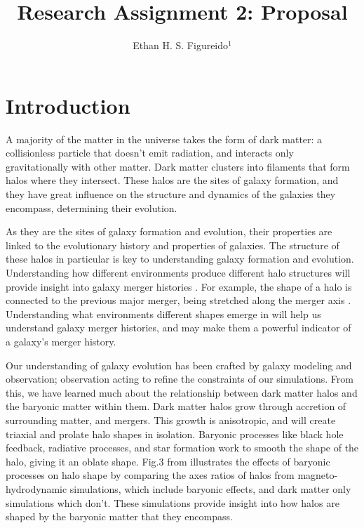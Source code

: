 \documentclass[fleqn,usenatbib]{mnras}
\title[Research Assignment 2]{Research Assignment 2: Proposal}
\author[E. H. S. Figureido]{Ethan H. S. Figureido$^{1}$}
\begin{document}
\label{firstpage}
\pagerange{\pageref{firstpage}--\pageref{lastpage}}
\maketitle



\section{Introduction}

A majority of the matter in the universe takes the form of dark matter: a collisionless particle that doesn't emit radiation, and interacts only gravitationally with other matter. Dark matter clusters into filaments that form halos where they intersect. These halos are the sites of galaxy formation, and they have great influence on the structure and dynamics of the galaxies they encompass, determining their evolution. 

As they are the sites of galaxy formation and evolution, their properties are linked to the evolutionary history and properties of galaxies. The structure of these halos in particular is key to understanding galaxy formation and evolution. Understanding how different environments produce different halo structures will provide insight into galaxy merger histories \citep{Drakos_2019}. For example, the shape of a halo is connected to the previous major merger, being stretched along the merger axis \citep{Despali_2016}. Understanding what environments different shapes emerge in will help us understand galaxy merger histories, and may make them a powerful indicator of a galaxy's merger history.

Our understanding of galaxy evolution has been crafted by galaxy modeling and observation; observation acting to refine the constraints of our simulations. From this, we have learned much about the relationship between dark matter halos and the baryonic matter within them. Dark matter halos grow through accretion of surrounding matter, and mergers. This growth is anisotropic, and will create triaxial and prolate halo shapes in isolation. Baryonic processes like black hole feedback, radiative processes, and star formation work to smooth the shape of the halo, giving it an oblate shape. Fig.3 from \citet{Prada_2019} illustrates the effects of baryonic processes on halo shape by comparing the axes ratios of halos from magneto-hydrodynamic simulations, which include baryonic effects, and dark matter only simulations which don't. These simulations provide insight into how halos are shaped by the baryonic matter that they encompass. 
\end{document}
